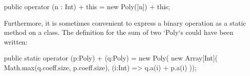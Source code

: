 % 
\begin{xten}
   public operator (n : Int) + this = new Poly([n]) + this;
\end{xten}
% 
%     

Furthermore, it is sometimes convenient to express a binary operation as a
static method on a class. 
The definition for the sum of two
\xcd`Poly`s could have been written:
\begin{xten}
  public static operator (p:Poly) + (q:Poly) =  new Poly(
     new Array[Int](
        Math.max(q.coeff.size, p.coeff.size),
        (i:Int) => q.a(i) + p.a(i)
     ));
\end{xten}
%
% 
%     

